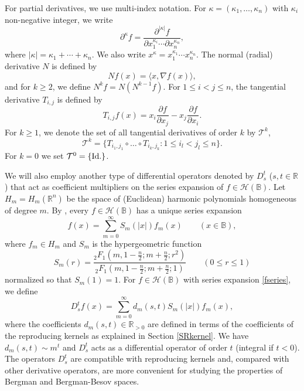 \documentclass{amsart}
\theoremstyle{definition}
\theoremstyle{remark}
\begin{document}
For partial derivatives, we use multi-index notation.
For $\kappa=(\kappa_1,\ldots,\kappa_n)$ with $\kappa_i$ non-negative
integer, we write
\begin{equation*}
\partial^\kappa f
=\frac{\partial^{\vert\kappa\vert}f}
{\partial x_1^{\kappa_i}\cdots\partial x_n^{\kappa_n}},
\end{equation*}
where $\vert\kappa\vert=\kappa_1+\cdots+\kappa_n$.
We also write $x^\kappa=x_1^{\kappa_1}\cdots x_n^{\kappa_n}$.
The normal (radial) derivative $N$ is defined by
\begin{equation*}
  Nf(x)=\langle x,\nabla f(x)\rangle,
\end{equation*}
and for $k\ge 2$, we define $N^k f=N(N^{k-1}f)$.
For $1\le i<j\le n$, the tangential derivative $T_{i,j}$ is
defined by
\begin{equation*}
T_{i,j}f(x)
=x_i\frac{\partial f}{\partial x_j}-x_j\frac{\partial f}{\partial x_i}.
\end{equation*}
For $k\ge 1$, we denote the set of all tangential derivatives of
order $k$ by $\mathcal T^k$,
\begin{equation*}
\mathcal T^k=\{T_{i_1,j_1}\circ\dots\circ T_{i_k,j_k}\colon
1\le i_l<j_l\le n\}.
\end{equation*}
For $k=0$ we set $\mathcal T^0=\{\textup{Id.}\}$.

We will also employ another type of differential operators
denoted by $D^t_s$ ($s,t\in\mathbb R$) that act as coefficient
multipliers on the series expansion of $f\in\mathcal H(\mathbb B)$.
Let $H_m=H_m(\mathbb R^n)$ be the space of (Euclidean) harmonic
polynomials homogeneous of degree $m$.
By \cite[Theorem 6.3.1]{St1}, every $f\in\mathcal H(\mathbb B)$ has a unique
series expansion
\begin{equation}\label{fseries}
f(x)=\sum_{m=0}^\infty S_m(\vert x\vert)f_m(x)
\qquad (x\in\mathbb B),
\end{equation}
where $f_m\in H_m$ and $S_m$ is the hypergeometric function
\begin{equation}\label{Sm}
S_m(r)=\frac{{}_2F_1(m,1-\frac{n}{2};m+\frac{n}{2};r^2)}
{{}_2F_1(m,1-\frac{n}{2};m+\frac{n}{2};1)}
\qquad(0\le r\le 1)
\end{equation}
normalized so that $S_m(1)=1$.
For $f\in\mathcal H(\mathbb B)$ with series expansion \eqref{fseries},
we define
\begin{equation*}
D^t_s f(x)=\sum_{m=0}^\infty d_m(s,t)S_m(\vert x\vert)f_m(x),
\end{equation*}
where the coefficients $d_m(s,t)\in\mathbb R_{>0}$ are defined in
terms of the coefficients of the reproducing kernels as explained
in Section \ref{SRkernel}.
We have $d_m(s,t)\sim m^t$ and $D^t_s$ acts as a differential operator of
order $t$ (integral if $t<0$).
The operators $D^t_s$ are compatible with reproducing kernels and,
compared with other derivative operators, are more convenient
for studying the properties of Bergman and Bergman-Besov spaces.
\end{document}
